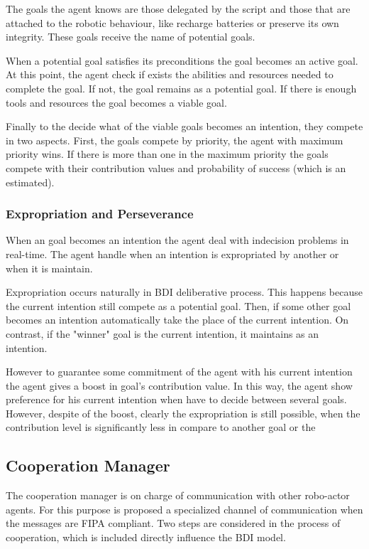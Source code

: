 The goals the agent knows are those  delegated by the script and those that are attached to the robotic behaviour, like recharge batteries or preserve its own integrity. These goals receive the name of potential goals. 

When a potential goal satisfies its preconditions the goal becomes an active goal. At this point, the agent check if exists the abilities and resources needed to complete the goal. If not, the goal remains as a potential goal. If there is enough tools and resources the goal becomes a viable goal.  

Finally to the decide what of the viable goals becomes an intention, they compete in two aspects. First, the goals compete by priority, the agent with maximum priority wins. If there is more than one in the maximum priority the goals compete with their contribution values and probability of success (which is an estimated).

\subsubsection{Expropriation and Perseverance}

When an goal becomes an intention the agent deal with indecision problems in real-time. The agent handle when an intention is expropriated by another or when it is maintain.

Expropriation occurs naturally in BDI deliberative process. This happens because the current intention still compete as a potential goal. Then, if some other goal becomes an intention automatically take the place of the current intention. On contrast, if the "winner" goal is the current intention, it maintains as an intention.

However to guarantee some commitment of the agent with his current intention the agent gives a boost in goal's contribution value. In this way, the agent show preference for his current intention when have to decide between several goals. However, despite of the boost, clearly the expropriation is still possible, when the contribution level  is significantly less in compare to another goal or the 


\subsection{Cooperation Manager}

The cooperation manager is on charge of communication with other robo-actor agents. For this purpose is proposed a specialized channel of communication when the messages are FIPA compliant. Two steps are considered in the process of cooperation, which is included directly influence the BDI model. 

